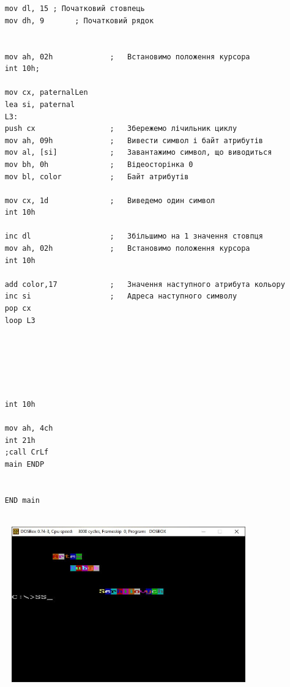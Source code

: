 \documentclass[12pt]{extarticle}
\begin{document}
\begin{verbatim}
    
    
    mov dl, 15 ; Початковий стовпець 
    mov dh, 9		; Початковий рядок
    
    
    mov ah, 02h				;   Встановимо положення курсора
    int 10h;
    
    mov cx, paternalLen
    lea si, paternal
    L3:
    push cx				    ;   Збережемо лічильник циклу
    mov ah, 09h				;   Вивести символ і байт атрибутів
    mov al, [si]			;   Завантажимо символ, що виводиться
    mov bh, 0h				;   Відеосторінка 0
    mov bl, color			;   Байт атрибутів
    
    mov cx, 1d				;   Виведемо один символ
    int 10h
    
    inc dl					;   Збільшимо на 1 значення стовпця
    mov ah, 02h				;   Встановимо положення курсора
    int 10h
    
    add color,17			;   Значення наступного атрибута кольору
    inc si					;   Адреса наступного символу
    pop cx
    loop L3
    
    
    
    
    
    
    int 10h
    
    mov ah, 4ch
    int 21h
    ;call CrLf 
    main ENDP
    
    
    END main
    

\end{verbatim}

\vspace{12pt}
\begin{figure}[H]
    \centering
    \includegraphics[width=0.90\textwidth]{name.jpg}
    \caption{}
\end{figure}
\end{document}

